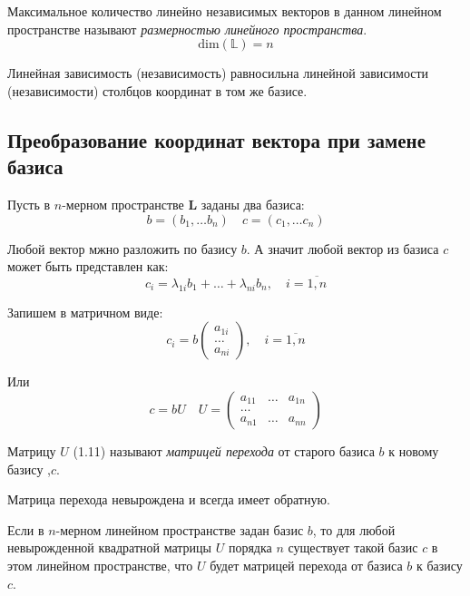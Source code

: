 \begin{definition}
    Максимальное количество линейно независимых векторов в данном линейном пространстве называют \textit{размерностью линейного пространства}. \[
        \mathrm{dim} (\mathbb{L}) = n
    \]
\end{definition}

Линейная зависимость (независимость) равносильна линейной зависимости (независимости) столбцов координат в том же базисе.

\subsection{Преобразование координат вектора при замене базиса}

Пусть в $n$-мерном пространстве $\mathbf{L}$ заданы два базиса:  \[
  b = \left( b_1, \ldots b_n \right) \quad c = \left( c_1, \ldots c_n \right) 
\] 

Любой вектор мжно разложить по базису $b$. А значит любой вектор из базиса  $c$ может быть представлен как:  \[
  c_i = \lambda_{1i} b_1 + \ldots + \lambda_{ni} b_n,
  \quad i = \overline{1, n}
\] 

Запишем в матричном виде: \[
  c_i = b
  \begin{pmatrix}
    a_{1i} \\ \ldots \\ a_{ni}
  \end{pmatrix},
  \quad i = \overline{1, n}
\] 

Или \[
  c = bU \quad U = 
  \begin{pmatrix}
    a_{11} & \ldots & a_{1n} \\
    \ldots \\
    a_{n1} & \ldots & a_{nn}
  \end{pmatrix}
  \tag{1.11}
\] 

\begin{definition}
  Матрицу $U$ (1.11) называют \textit{матрицей перехода} от старого базиса $b$ к новому базису ,$c$.
\end{definition}

\begin{property}[1]
  Матрица перехода невырождена и всегда имеет обратную.
\end{property}

\begin{property}[2]
    Если в $n$-мерном линейном пространстве задан базис $b$, то для любой невырожденной квадратной матрицы $U$ порядка $n$ существует такой базис $c$ в этом линейном пространстве, что $U$ будет матрицей перехода от базиса $b$ к базису $c$.
\end{property}

